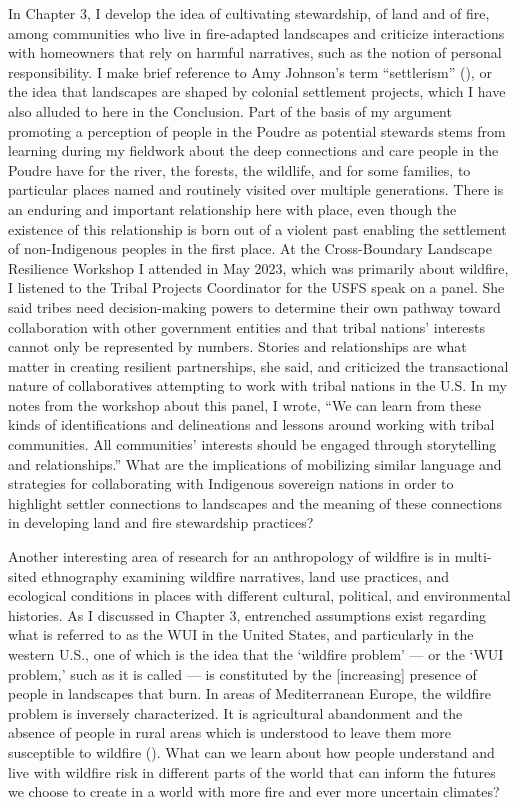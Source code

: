 \documentclass[
]{article}
\begin{document}
In Chapter 3, I develop the idea of cultivating stewardship, of land and of fire, among communities who live in fire-adapted landscapes and criticize interactions with homeowners that rely on harmful narratives, such as the notion of personal responsibility. I make brief reference to Amy Johnson's term ``settlerism'' (), or the idea that landscapes are shaped by colonial settlement projects, which I have also alluded to here in the Conclusion. Part of the basis of my argument promoting a perception of people in the Poudre as potential stewards stems from learning during my fieldwork about the deep connections and care people in the Poudre have for the river, the forests, the wildlife, and for some families, to particular places named and routinely visited over multiple generations. There is an enduring and important relationship here with place, even though the existence of this relationship is born out of a violent past enabling the settlement of non-Indigenous peoples in the first place. At the Cross-Boundary Landscape Resilience Workshop I attended in May 2023, which was primarily about wildfire, I listened to the Tribal Projects Coordinator for the USFS speak on a panel. She said tribes need decision-making powers to determine their own pathway toward collaboration with other government entities and that tribal nations' interests cannot only be represented by numbers. Stories and relationships are what matter in creating resilient partnerships, she said, and criticized the transactional nature of collaboratives attempting to work with tribal nations in the U.S. In my notes from the workshop about this panel, I wrote, ``We can learn from these kinds of identifications and delineations and lessons around working with tribal communities. All communities' interests should be engaged through storytelling and relationships.'' What are the implications of mobilizing similar language and strategies for collaborating with Indigenous sovereign nations in order to highlight settler connections to landscapes and the meaning of these connections in developing land and fire stewardship practices?

Another interesting area of research for an anthropology of wildfire is in multi-sited ethnography examining wildfire narratives, land use practices, and ecological conditions in places with different cultural, political, and environmental histories. As I discussed in Chapter 3, entrenched assumptions exist regarding what is referred to as the WUI in the United States, and particularly in the western U.S., one of which is the idea that the `wildfire problem' --- or the `WUI problem,' such as it is called --- is constituted by the {[}increasing{]} presence of people in landscapes that burn. In areas of Mediterranean Europe, the wildfire problem is inversely characterized. It is agricultural abandonment and the absence of people in rural areas which is understood to leave them more susceptible to wildfire (). What can we learn about how people understand and live with wildfire risk in different parts of the world that can inform the futures we choose to create in a world with more fire and ever more uncertain climates?
\end{document}

